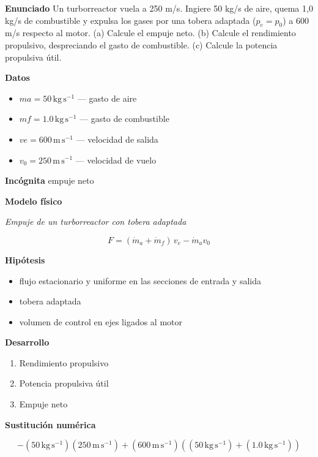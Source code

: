 \documentclass[10pt,openany]{book}
\begin{document}
\begin{tcolorbox}[title={Problema resuelto}, studiumworked, breakable]

\noindent\textbf{Enunciado}
Un turborreactor vuela a 250 m/s. Ingiere 50 kg/s de aire, quema 1,0 kg/s de combustible y expulsa los gases por una tobera adaptada (\(p_e = p_0\)) a 600 m/s respecto al motor. (a) Calcule el empuje neto. (b) Calcule el rendimiento propulsivo, despreciando el gasto de combustible. (c) Calcule la potencia propulsiva útil.

\noindent\textbf{Datos}
\begin{itemize}
\item $ma = 50\,\mathrm{kg}\,\mathrm{s}^{-1}$ — gasto de aire
\item $mf = 1.0\,\mathrm{kg}\,\mathrm{s}^{-1}$ — gasto de combustible
\item $ve = 600\,\mathrm{m}\,\mathrm{s}^{-1}$ — velocidad de salida
\item $v_{0} = 250\,\mathrm{m}\,\mathrm{s}^{-1}$ — velocidad de vuelo
\end{itemize}

\noindent\textbf{Incógnita}
empuje neto

\noindent\textbf{Modelo físico}

\noindent\textit{Empuje de un turborreactor con tobera adaptada}

\[
F = (\dot m_a + \dot m_f)\,v_e - \dot m_a v_0
\]

\noindent\textbf{Hipótesis}
\begin{itemize}
\item flujo estacionario y uniforme en las secciones de entrada y salida
\item tobera adaptada
\item volumen de control en ejes ligados al motor
\end{itemize}

\noindent\textbf{Desarrollo}
\begin{enumerate}
\item
Rendimiento propulsivo
\item
Potencia propulsiva útil
\item
Empuje neto
\end{enumerate}

\noindent\textbf{Sustitución numérica}

\[
- \left(50\,\mathrm{kg}\,\mathrm{s}^{-1}\right) \left(250\,\mathrm{m}\,\mathrm{s}^{-1}\right) + \left(600\,\mathrm{m}\,\mathrm{s}^{-1}\right) \left(\left(50\,\mathrm{kg}\,\mathrm{s}^{-1}\right) + \left(1.0\,\mathrm{kg}\,\mathrm{s}^{-1}\right)\right)
\]


\end{tcolorbox}
\end{document}
